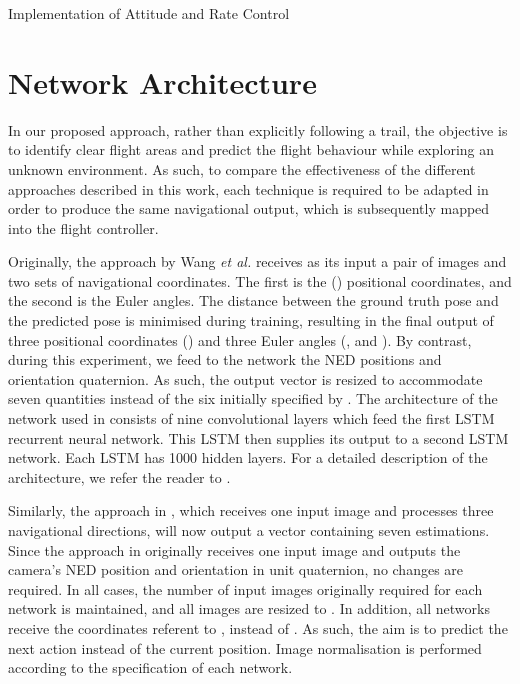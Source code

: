 \documentclass[letterpaper, 10 pt, journal, twoside]{IEEEtran}
\newcommand{\etal}{\emph{et al.}}
\begin{document}
\begin{algorithm}
\label{control_loop}
\SetAlgoLined
{}

\caption{Implementation of Attitude and Rate Control}
\end{algorithm}

\section{Network Architecture}
In our proposed approach, rather than explicitly following a trail, the objective is to identify clear flight areas and predict the flight behaviour while exploring an unknown environment.  As such, to compare the effectiveness of the different approaches described in this work, each technique is required to be adapted in order to produce the same navigational output, which is subsequently mapped into the flight controller.

Originally, the approach by Wang \etal \cite{wang2017deepvo} receives as its input a pair of images and two sets of navigational coordinates. The first is the () positional coordinates, and the second is the Euler angles. The distance between the ground truth pose and the predicted pose is minimised during training, resulting in the final output of three positional coordinates () and three Euler angles (,  and ). By contrast, during this experiment, we feed to the network the NED positions and orientation quaternion. As such, the output vector is resized to accommodate seven quantities instead of the six initially specified by \cite{wang2017deepvo}. The architecture of the network used in \cite{wang2017deepvo} consists of nine convolutional layers which feed the first LSTM recurrent neural network. This LSTM then supplies its output to a second LSTM network. Each LSTM has 1000 hidden layers. For a detailed description of the architecture, we refer the reader to \cite{wang2017deepvo}.

Similarly, the approach in \cite{bojarski2016end}, which receives one input image and processes three navigational directions, will now output a vector containing seven estimations. Since the approach in \cite{kendall2015posenet} originally receives one input image and outputs the camera's  NED position and orientation in unit quaternion, no changes are required. In all cases, the number of input images originally required for each network is maintained, and all images are resized to . In addition, all networks receive the coordinates referent to , instead of . As such, the aim is to predict the next action instead of the current position. Image normalisation is performed according to the specification of each network.\vspace{-0.2cm}
\end{document}
